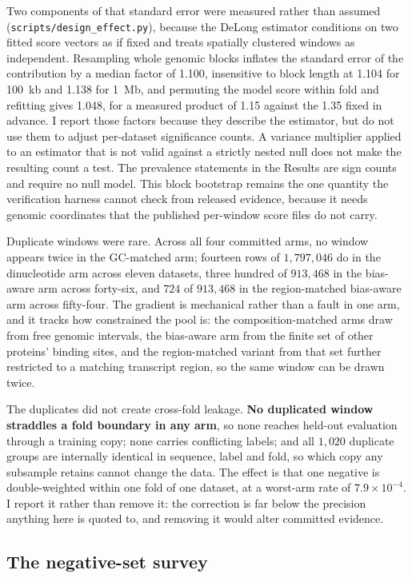 Two components of that standard error were measured rather than assumed
(\texttt{scripts/\allowbreak design\_effect.py}), because the DeLong estimator conditions on two fitted score
vectors as if fixed and treats spatially clustered windows as independent. Resampling whole
genomic blocks inflates the standard error of the contribution by a median factor of 1.100,
insensitive to block length at 1.104 for 100~kb and 1.138 for 1~Mb, and permuting the model
score within fold and refitting gives 1.048, for a measured product of 1.15 against the 1.35
fixed in advance. I report those factors because they describe the estimator, but do not use
them to adjust per-dataset significance counts. A variance multiplier applied to an estimator
that is not valid against a strictly nested null does not make the resulting count a test. The
prevalence statements in the Results are sign counts and require no null model. This block bootstrap remains the
one quantity the verification harness cannot check from released evidence, because it needs
genomic coordinates that the published per-window score files do not carry.

Duplicate windows were rare. Across all four committed arms, no window appears twice in the GC-matched
arm; fourteen rows of $1{,}797{,}046$ do in the dinucleotide arm across eleven datasets, three
hundred of $913{,}468$ in the bias-aware arm across forty-six, and $724$ of $913{,}468$ in the
region-matched bias-aware arm across fifty-four. The gradient is mechanical rather than a fault
in one arm, and it tracks how constrained the pool is: the composition-matched arms draw from
free genomic intervals, the bias-aware arm from the finite set of other proteins' binding sites,
and the region-matched variant from that set further restricted to a matching transcript region,
so the same window can be drawn twice.

The duplicates did not create cross-fold leakage. \textbf{No duplicated window straddles a
fold boundary in any arm}, so none reaches held-out
evaluation through a training copy; none carries conflicting labels; and all $1{,}020$
duplicate groups are internally identical in sequence, label and fold, so which copy any
subsample retains cannot change the data. The effect is that one negative is double-weighted
within one fold of one dataset, at a worst-arm rate of $7.9\times10^{-4}$. I report it rather
than remove it: the correction is far below the precision anything here is quoted to, and
removing it would alter committed evidence.

\subsection{The negative-set survey}
\label{sec:survey}

